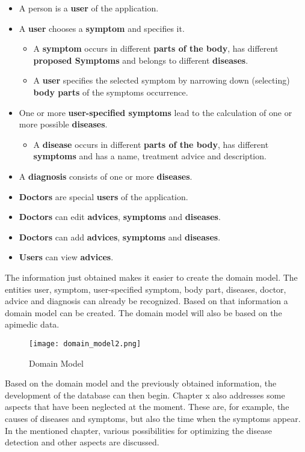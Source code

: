 \begin{itemize}
	\item A person is a \textbf{user} of the application.
	\item A \textbf{user} chooses a \textbf{symptom} and specifies it.
	\begin{itemize}
		\item A \textbf{symptom} occurs in different \textbf{parts of the body}, has different \textbf{proposed Symptoms} and belongs to different \textbf{diseases}.
		\item A \textbf{user} specifies the selected symptom by narrowing down (selecting) \textbf{body parts} of the symptoms occurrence.
	\end{itemize}
	\item One or more \textbf{user-specified symptoms} lead to the calculation of one or more possible \textbf{diseases}.
	\begin{itemize}
		\item A \textbf{disease} occurs in different \textbf{parts of the body}, has different \textbf{symptoms} and has a name, treatment advice and description.
	\end{itemize}
	\item A \textbf{diagnosis} consists of one or more \textbf{diseases}.
	\item \textbf{Doctors} are special \textbf{users} of the application.
	\item \textbf{Doctors} can edit \textbf{advices}, \textbf{symptoms} and \textbf{diseases}.
	\item \textbf{Doctors} can add \textbf{advices}, \textbf{symptoms} and \textbf{diseases}.
	\item \textbf{Users} can view \textbf{advices}.  
\end{itemize}

The information just obtained makes it easier to create the domain model. The entities user, symptom, user-specified symptom, body part, diseases, doctor, advice and diagnosis can already be recognized. Based on that information a domain model can be created. The domain model will also be based on the apimedic data.
\begin{figure}[H]
	\centering
	\texttt{[image: domain\_model2.png]}
	\caption[Domain Model]{Domain Model}
\end{figure}
Based on the domain model and the previously obtained information, the development of the database can then begin. Chapter x also addresses some aspects that have been neglected at the moment. These are, for example, the causes of diseases and symptoms, but also the time when the symptoms appear. In the mentioned chapter, various possibilities for optimizing the disease detection and other aspects are discussed.

